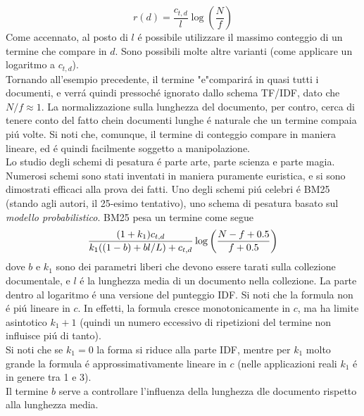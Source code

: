 \begin{equation*}
    r(d) = \frac{c_{t, d}}{l}\log(\frac{N}{f})
\end{equation*}
Come accennato, al posto di $l$ é possibile utilizzare il massimo conteggio di un termine che compare in $d$. Sono possibili molte altre varianti (come applicare un logaritmo a $c_{t, d}$).\\
Tornando all'esempio precedente, il termine "e"comparirá in quasi tutti i documenti, e verrá quindi pressoché ignorato dallo schema TF/IDF, dato che $N / f \approx 1$. La normalizzazione sulla lunghezza del documento, per contro, cerca di tenere conto del fatto chein documenti lunghe é naturale che un termine compaia piú volte. Si noti che, comunque, il termine di conteggio compare in maniera lineare, ed é quindi facilmente soggetto a manipolazione.\\
Lo studio degli schemi di pesatura é parte arte, parte scienza e parte magia. Numerosi schemi sono stati inventati in maniera puramente euristica, e si sono dimostrati efficaci alla prova dei fatti. Uno degli schemi piú celebri é BM25 (stando agli autori, il 25-esimo tentativo), uno schema di pesatura basato sul \textit{modello probabilistico}. BM25 pesa un termine come segue
\begin{equation*}
    \frac{(1 + k_1)c_{t, d}}{k_1((1 - b) + bl / L) + c_{t, d}}\log\left(\frac{N - f + 0.5}{f + 0.5}\right)
\end{equation*}
dove $b$ e $k_1$ sono dei parametri liberi che devono essere tarati sulla collezione documentale, e $l$ é la lunghezza media di un documento nella collezione. La parte dentro al logaritmo é una versione del punteggio IDF. Si noti che la formula non é piú lineare in $c$. In effetti, la formula cresce monotonicamente in $c$, ma ha limite asintotico $k_1 + 1$ (quindi un numero eccessivo di ripetizioni del termine non influisce piú di tanto).\\
Si noti che se $k_1 = 0$ la forma si riduce alla parte IDF, mentre per $k_1$ molto grande la formula é approssimativamente lineare in $c$ (nelle applicazioni reali $k_1$ é in genere tra 1 e 3).\\
Il termine $b$ serve a controllare l'influenza della lunghezza dle documento rispetto alla lunghezza media.